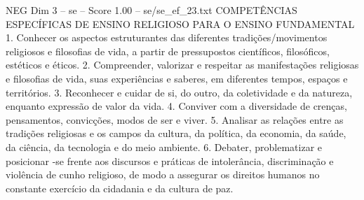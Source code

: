\begin{textsample}{NEG Dim 3 – se – Score 1.00 – se/se\_ef\_23.txt}  \label{ex:f3_neg_127}
COMPETÊNCIAS ESPECÍFICAS DE ENSINO RELIGIOSO PARA O ENSINO FUNDAMENTAL 1.
Conhecer os aspectos estruturantes das diferentes tradições/movimentos religiosos e filosofias de vida, a partir de pressupostos científicos, filosóficos, estéticos e éticos. 2.
Compreender, valorizar e respeitar as manifestações religiosas e filosofias de vida, suas experiências e saberes, em diferentes tempos, espaços e territórios. 3.
Reconhecer e cuidar de si, do outro, da coletividade e da natureza, enquanto expressão de valor da vida. 4.
Conviver com a diversidade de crenças, pensamentos, convicções, modos de ser e viver. 5.
Analisar as relações entre as tradições religiosas e os campos da cultura, da política, da economia, da saúde, da ciência, da tecnologia e do meio ambiente. 6.
Debater, problematizar e posicionar -se frente aos discursos e práticas de intolerância, discriminação e violência de cunho religioso, de modo a assegurar os direitos humanos no constante exercício da cidadania e da cultura de paz.

\end{textsample}
